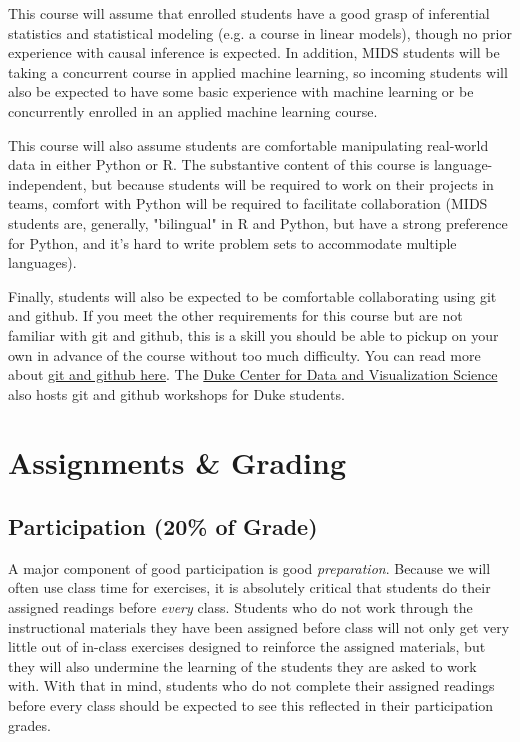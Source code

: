 \documentclass[12pt]{article}
\begin{document}
This course will assume that enrolled students have a good grasp of inferential statistics and statistical modeling (e.g. a course in linear models), though no prior experience with causal inference is expected. In addition, MIDS students will be taking a concurrent course in applied machine learning, so incoming students will also be expected to have some basic experience with machine learning or be concurrently enrolled in an applied machine learning course.

This course will also assume students are comfortable manipulating real-world data in either Python or R. The substantive content of this course is language-independent, but because students will be required to work on their projects in teams, comfort with Python will be required to facilitate collaboration (MIDS students are, generally, "bilingual" in R and Python, but have a strong preference for Python, and it's hard to write problem sets to accommodate multiple languages).

Finally, students will also be expected to be comfortable collaborating using git and github. If you meet the other requirements for this course but are not familiar with git and github, this is a skill you should be able to pickup on your own in advance of the course without too much difficulty. You can read more about \href{https://www.practicaldatascience.org/html/git_and_github.html}{git and github here}. The \href{https://library.duke.edu/data/}{Duke Center for Data and Visualization Science} also hosts git and github workshops for Duke students.


\section{Assignments \& Grading}

\subsection{Participation (20\% of Grade)}

A major component of good participation is good \emph{preparation}. Because we will often use class time for exercises, it is absolutely critical that students do their assigned readings before \emph{every} class. Students who do not work through the instructional materials they have been assigned before class will not only get very little out of in-class exercises designed to reinforce the assigned materials, but they will also undermine the learning of the students they are asked to work with. With that in mind, students who do not complete their assigned readings before every class should be expected to see this reflected in their participation grades.
\end{document}
